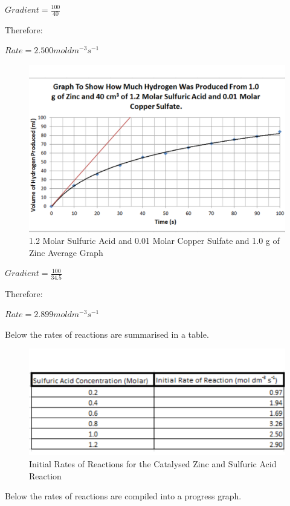 $Gradient = \frac{100}{40}$

Therefore:

$Rate = 2.500 mol dm^{-3} s^{-1}$

\begin{figure}[H]
    \includegraphics[width=\textwidth]{./Analysis/Images/2Catalysed/12Molar.pdf}
    \caption{1.2 Molar Sulfuric Acid and 0.01 Molar Copper Sulfate and 1.0 g of Zinc Average Graph} \label{fig:12MolarSACSGradient}
\end{figure}

$Gradient = \frac{100}{34.5}$

Therefore:

$Rate = 2.899 mol dm^{-3} s^{-1}$

Below the rates of reactions are summarised in a table.

\begin{figure}[H]
    \includegraphics[width=\textwidth]{./Analysis/Images/2Catalysed/Rates.pdf}
    \caption{Initial Rates of Reactions for the Catalysed Zinc and Sulfuric Acid Reaction} \label{fig:RatesSACS}
\end{figure}

Below the rates of reactions are compiled into a progress graph.

